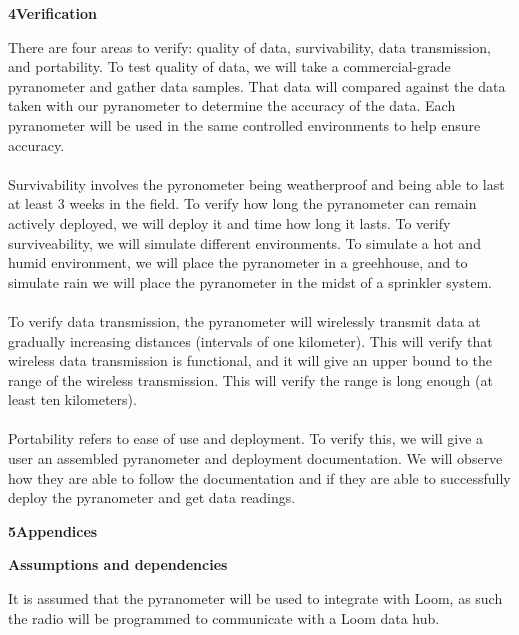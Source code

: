 \documentclass[10pt,draftclsnofoot,onecolumn,letterpaper]{article}
\begin{document}
{\fontsize{12pt}{12.0pt} \textbf{4\quad Verification}\\\selectfont 
\par}\par
{\fontsize{10pt}{12.0pt} There are four areas to verify: quality of data, survivability, data transmission, and portability. To test quality of data, we will take a commercial-grade pyranometer and gather data samples. That data will compared against the data taken with our pyranometer to determine the accuracy of the data. Each pyranometer will be used in the same controlled environments to help ensure accuracy.\\\\ Survivability involves the pyronometer being weatherproof and being able to last at least 3 weeks in the field. To verify how long the pyranometer can remain actively deployed, we will deploy it and time how long it lasts. To verify surviveability, we will simulate different environments. To simulate a hot and humid environment, we will place the pyranometer in a greehhouse, and to simulate rain we will place the pyranometer in the midst of a sprinkler system.\\\\To verify data transmission, the pyranometer will wirelessly transmit data at gradually increasing distances (intervals of one kilometer). This will verify that wireless data transmission is functional, and it will give an upper bound to the range of the wireless transmission. This will verify the range is long enough (at least ten kilometers).\\\\Portability refers to ease of use and deployment. To verify this, we will give a user an assembled pyranometer and deployment documentation. We will observe how they are able to follow the documentation and if they are able to successfully deploy the pyranometer and get data readings.\\\selectfont 
\par}\par

{\fontsize{12pt}{12.0pt} \textbf{5\quad Appendices}\\\selectfont 
\par}\par
{\fontsize{10pt}{12.0pt} \textbf{Assumptions and dependencies}\\\selectfont 
\par}\par
{\fontsize{10pt}{12.0pt} It is assumed that the pyranometer will be used to integrate with Loom, as such the radio will be programmed to communicate with a Loom data hub.\\\selectfont 
\par}\par
\end{document}
